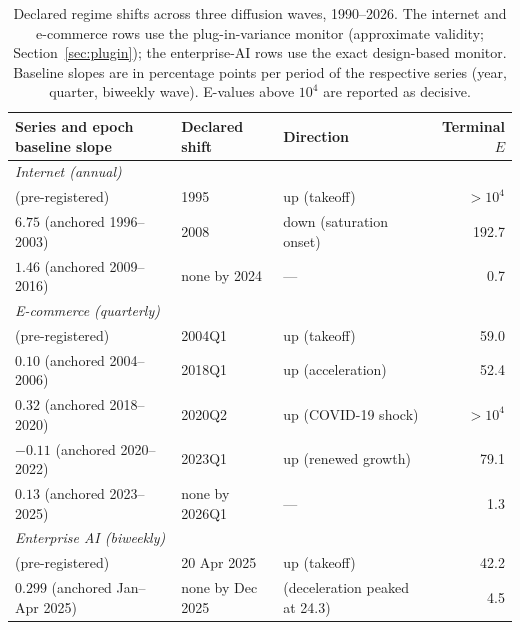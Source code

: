 \documentclass[review,authoryear,12pt]{elsarticle}
\begin{document}
\begin{table}[t]
\centering
\caption{Declared regime shifts across three diffusion waves, 1990--2026. The internet and e-commerce rows use the plug-in-variance monitor (approximate validity; Section~\ref{sec:plugin}); the enterprise-AI rows use the exact design-based monitor. Baseline slopes are in percentage points per period of the respective series (year, quarter, biweekly wave). E-values above $10^4$ are reported as decisive.}
\label{tab:longview}
\small
\begin{tabular}{lllr}
\toprule
Series and epoch baseline slope & Declared shift & Direction & Terminal $E$ \\
\midrule
\textit{Internet (annual)} & & & \\
\quad 0 (pre-registered) & 1995 & up (takeoff) & $>10^4$ \\
\quad $6.75$ (anchored 1996--2003) & 2008 & down (saturation onset) & 192.7 \\
\quad $1.46$ (anchored 2009--2016) & none by 2024 & --- & 0.7 \\
\addlinespace
\textit{E-commerce (quarterly)} & & & \\
\quad 0 (pre-registered) & 2004Q1 & up (takeoff) & 59.0 \\
\quad $0.10$ (anchored 2004--2006) & 2018Q1 & up (acceleration) & 52.4 \\
\quad $0.32$ (anchored 2018--2020) & 2020Q2 & up (COVID-19 shock) & $>10^4$ \\
\quad $-0.11$ (anchored 2020--2022) & 2023Q1 & up (renewed growth) & 79.1 \\
\quad $0.13$ (anchored 2023--2025) & none by 2026Q1 & --- & 1.3 \\
\addlinespace
\textit{Enterprise AI (biweekly)} & & & \\
\quad 0 (pre-registered) & 20 Apr 2025 & up (takeoff) & 42.2 \\
\quad $0.299$ (anchored Jan--Apr 2025) & none by Dec 2025 & (deceleration peaked at 24.3) & 4.5 \\
\bottomrule
\end{tabular}
\end{table}
\end{document}
